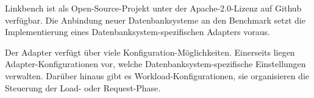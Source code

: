 Linkbench ist als Open-Source-Projekt unter der Apache-2.0-Lizenz auf Github verfügbar. Die Anbindung neuer Datenbanksysteme an den Benchmark setzt die Implementierung eines Datenbanksystem-spezifischen Adapters voraus. 

Der Adapter verfügt über viele Konfiguration-Möglichkeiten. Einerseits liegen Adapter-Konfigurationen vor, welche Datenbanksystem-spezifische Einstellungen verwalten. Darüber hinaus gibt es Workload-Konfigurationen, sie organisieren  die Steuerung der Load- oder Request-Phase. 